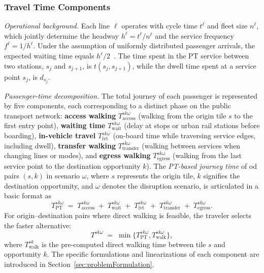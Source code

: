 \documentclass[3p,times,procedia]{elsarticle}
\begin{document}
\subsubsection{Travel Time Components}
\label{subsubsec:travel_time}

\textit{Operational background.} 
Each line $\ell$ operates with cycle time $t^\ell$ and fleet size $n^\ell$, which jointly determine the headway $h^\ell = t^\ell/n^\ell$ and the service frequency $f^\ell = 1/h^\ell$. Under the assumption of uniformly distributed passenger arrivals, the expected waiting time equals $h^\ell/2$~\citep{osuna1972control,pinto2020joint}. The time spent in the PT service between two stations, $s_j$ and $s_{j+1}$, is $t(s_j,s_{j+1})$, while the dwell time spent at a service point $s_j$, is $d_{s_j}$.

\textit{Passenger-time decomposition.}
The total journey of each passenger is represented by five components, each corresponding to a distinct phase on the public transport network: 
\textbf{access walking} $T^{sk\omega}_{\text{access}}$ (walking from the origin tile $s$ to the first entry point), 
\textbf{waiting time} $T^{sk\omega}_{\text{wait}}$ (delay at stops or urban rail stations before boarding),
\textbf{in-vehicle travel} $T^{sk\omega}_{\text{ivt}}$ (on-board time while traversing service edges, including dwell),
\textbf{transfer walking} $T^{sk\omega}_{\text{transfer}}$ (walking between services when changing lines or modes), and 
\textbf{egress walking} $T^{sk\omega}_{\text{egress}}$ (walking from the last service point to the destination opportunity $k$).
%
The \emph{PT-based journey time} of od pairs $(s,k)$ in scenario $\omega$, where $s$ represents the origin tile, $k$ signifies the destination opportunity, and $\omega$ denotes the disruption scenario, is articulated in a basic format as
\begin{equation}
T^{sk\omega}_{\text{PT}}
\;=\;
T^{sk\omega}_{\text{access}}
\;+\;
T^{sk\omega}_{\text{wait}}
\;+\;
T^{sk\omega}_{\text{ivt}}
\;+\;
T^{sk\omega}_{\text{transfer}}
\;+\;
T^{sk\omega}_{\text{egress}} .
\label{eq:tt1_general}
\end{equation}
%
For origin--destination pairs where direct walking is feasible, the traveler selects the faster alternative:
\begin{equation}
T^{sk\omega} \;=\; \min \{T^{sk\omega}_{\text{PT}}, T^{sk\omega}_{\text{walk}}\},
\label{eq:tt1_walk}
\end{equation}
where $T^{sk}_{\text{walk}}$ is the pre-computed direct walking time between tile $s$ and opportunity $k$. The specific formulations and linearizations of each component are introduced in Section~\ref{sec:problemFormulation}.
\end{document}
